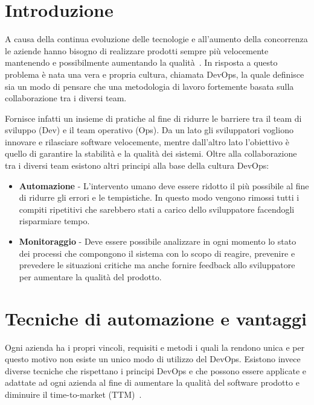 
\section{Introduzione}
A causa della continua evoluzione delle tecnologie e all'aumento della concorrenza le aziende hanno bisogno di realizzare prodotti sempre più velocemente mantenendo e possibilmente aumentando la qualità~\cite{krief2019learning}. In risposta a questo problema è nata una vera e propria cultura, chiamata DevOps, la quale definisce sia un modo di pensare che una metodologia di lavoro fortemente basata sulla collaborazione tra i diversi team.

Fornisce infatti un insieme di pratiche al fine di ridurre le barriere tra il team di sviluppo (Dev) e il team operativo (Ops). Da un lato gli sviluppatori vogliono innovare e rilasciare software velocemente, mentre dall'altro lato l'obiettivo è quello di garantire la stabilità e la qualità dei sistemi. Oltre alla collaborazione tra i diversi team esistono altri principi alla base della cultura DevOps:
\begin{itemize}
    \item \textbf{Automazione} - L'intervento umano deve essere ridotto il più possibile al fine di ridurre gli errori e le tempistiche. In questo modo vengono rimossi tutti i compiti ripetitivi che sarebbero stati a carico dello sviluppatore facendogli risparmiare tempo.
    \item \textbf{Monitoraggio} - Deve essere possibile analizzare in ogni momento lo stato dei processi che compongono il sistema con lo scopo di reagire, prevenire e prevedere le situazioni critiche ma anche fornire feedback allo sviluppatore per aumentare la qualità del prodotto.
\end{itemize}

\section{Tecniche di automazione e vantaggi}
Ogni azienda ha i propri vincoli, requisiti e metodi i quali la rendono unica e per questo motivo non esiste un unico modo di utilizzo del DevOps. Esistono invece diverse tecniche che rispettano i principi DevOps e che possono essere applicate e adattate ad ogni azienda al fine di aumentare la qualità del software prodotto e diminuire il time-to-market (TTM)~\cite{devis2016effective}.

